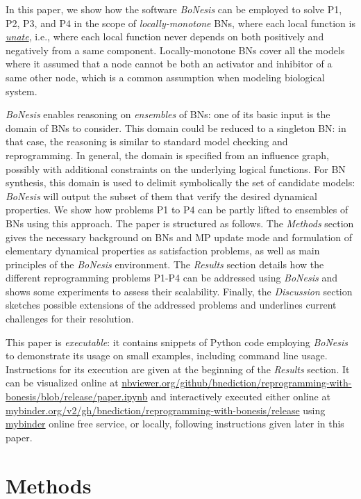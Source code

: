 \documentclass[PCJ,Unicode,screen,mode=plain]{cedram}
\begin{document}
In this paper, we show how the software \emph{BoNesis} can be employed
to solve P1, P2, P3, and P4 in the scope of \emph{locally-monotone} BNs,
where each local function is
\emph{\href{https://en.wikipedia.org/wiki/Unate_function}{unate}}, i.e.,
where each local function never depends on both positively and
negatively from a same component. Locally-monotone BNs cover all the
models where it assumed that a node cannot be both an activator and
inhibitor of a same other node, which is a common assumption when
modeling biological system.

\emph{BoNesis} enables reasoning on \emph{ensembles} of BNs: one of its
basic input is the domain of BNs to consider. This domain could be
reduced to a singleton BN: in that case, the reasoning is similar to
standard model checking and reprogramming. In general, the domain is
specified from an influence graph, possibly with additional constraints
on the underlying logical functions. For BN synthesis, this domain is
used to delimit symbolically the set of candidate models: \emph{BoNesis}
will output the subset of them that verify the desired dynamical
properties. We show how problems P1 to P4 can be partly lifted to
ensembles of BNs using this approach.
The paper is structured as follows. The \emph{Methods} section gives the
necessary background on BNs and MP update mode and formulation of
elementary dynamical properties as satisfaction problems, as well as
main principles of the \emph{BoNesis} environment. The \emph{Results}
section details how the different reprogramming problems P1-P4 can be
addressed using \emph{BoNesis} and shows some experiments to assess
their scalability. Finally, the \emph{Discussion} section sketches
possible extensions of the addressed problems and underlines current
challenges for their resolution.

This paper is \emph{executable}: it contains snippets of Python code
employing \emph{BoNesis} to demonstrate its usage on small examples,
including command line usage. Instructions for its execution are given
at the beginning of the \emph{Results} section. It can be visualized
online at
\href{https://nbviewer.org/github/bnediction/reprogramming-with-bonesis/blob/release/paper.ipynb}{nbviewer.org/github/bnediction/reprogramming-with-bonesis/blob/release/paper.ipynb}
and interactively executed either online at
\href{https://mybinder.org/v2/gh/bnediction/reprogramming-with-bonesis/release}{mybinder.org/v2/gh/bnediction/reprogramming-with-bonesis/release}
using \href{https://mybinder.org/}{mybinder} online free service, or
locally, following instructions given later in this paper.
\hypertarget{methods}{%
\section{Methods}\label{methods}}
\end{document}
